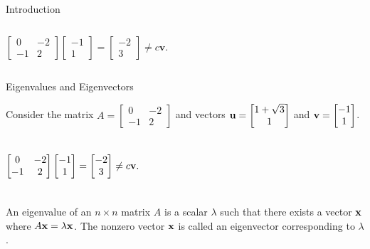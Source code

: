 \documentclass[xcolor=dvipsnames,aspectratio=169,t]{beamer}
\begin{document}
\begin{frame}{Introduction}
\begin{columns}[T]
  \column{0.4\tw}
  \alert{\[  \begin{bmatrix} 0 & -2 \\ -1 & 2 \end{bmatrix}\begin{bmatrix} -1 \\ 1 \end{bmatrix} = \begin{bmatrix} -2 \\ 3 \end{bmatrix} \ne c \mathbf{v} .\]}
  \end{columns}
\end{frame}


\begin{frame}{Eigenvalues and Eigenvectors}
  \bigskip

  Consider the matrix $A = \begin{bmatrix} 0 & -2 \\ -1 & 2 \end{bmatrix}$ and vectors $\mathbf{u} = \begin{bmatrix} 1+\sqrt{3} \\ 1 \end{bmatrix}$ and $\mathbf{v} = \begin{bmatrix} -1 \\ 1 \end{bmatrix}$.
  \medskip

  \begin{columns}[T]
  \column{0.6\tw}

  \column{0.4\tw}
  \alert{\[  \begin{bmatrix} 0 & -2 \\ -1 & 2 \end{bmatrix}\begin{bmatrix} -1 \\ 1 \end{bmatrix} = \begin{bmatrix} -2 \\ 3 \end{bmatrix} \ne c \mathbf{v} .\]}
  \end{columns}
  \bigskip

  \begin{definition}
    An \alert{eigenvalue} of an $n\times n$ matrix $A$ is a scalar $\lambda$ such that there exists a  vector $\mathbf{x}$ where $A\mathbf{x}=\lambda\mathbf{x}$.
    The nonzero vector $\mathbf{x}$ is called an \alert{eigenvector corresponding to $\lambda$}.
  \end{definition}
\end{frame}
\end{document}
